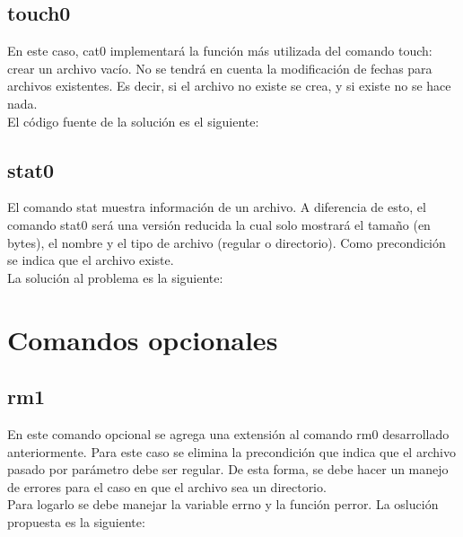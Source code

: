 \documentclass[a4paper, 12pt]{article}
\begin{document}
		\subsection{touch0}
		En este caso, cat0 implementará la función más utilizada del comando touch: crear un archivo vacío. No se tendrá en cuenta la modificación de fechas para archivos existentes. Es decir, si el archivo no existe se crea, y si existe no se hace nada.\\
		El código fuente de la solución es el siguiente:
		
		\bigskip\bigskip\bigskip
		
		
		\subsection{stat0}
		El comando stat muestra información de un archivo. A diferencia de esto, el comando stat0 será una versión reducida la cual solo mostrará el tamaño (en bytes), el nombre y el tipo de archivo (regular o directorio). Como precondición se indica que el archivo existe.\\
		La solución al problema es la siguiente:	
		
		\bigskip\bigskip\bigskip
		
		
	\newpage
	\section{Comandos opcionales}
		\subsection{rm1}
		En este comando opcional se agrega una extensión al comando rm0 desarrollado anteriormente. Para este caso se elimina la precondición que indica que el archivo pasado por parámetro debe ser regular. De esta forma, se debe hacer un manejo de errores para el caso en que el archivo sea un directorio.\\
		Para logarlo se debe manejar la variable errno y la función perror. La oslución propuesta es la siguiente:
		
		\bigskip\bigskip\bigskip
		
			
\end{document}
